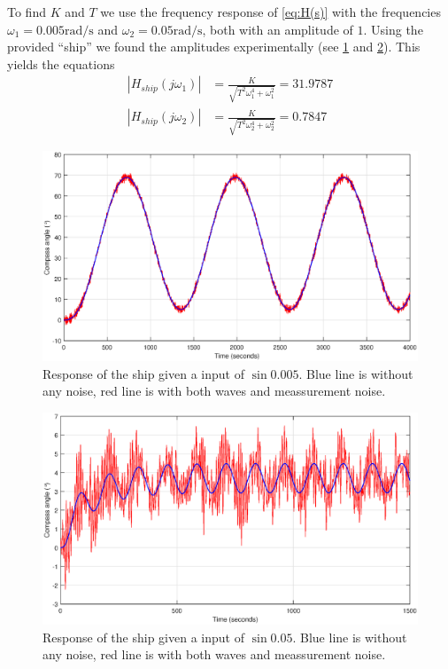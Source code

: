 To find $K$ and $T$ we use the frequency response of \cref{eq:H(s)} with the frequencies $\omega_1 = 0.005\si{\radian\per\second}$ and $\omega_2 = 0.05\si{\radian\per\second}$, both with an amplitude of $1$. Using the provided ``ship'' we found the amplitudes experimentally (see \cref{fig:sin0.005} and \cref{fig:sin0.05}). This yields the equations
\begin{subequations}
	\begin{align}
		|H_{ship}(j\omega_1)| &= \frac{K}{\sqrt{T^2\omega_1^4 + \omega_1^2}} = 31.9787 \label{eq:omega_1}\\
		|H_{ship}(j\omega_2)| &= \frac{K}{\sqrt{T^2\omega_2^4 + \omega_2^2}} = 0.7847 \label{eq:omega_2}
	\end{align}
\end{subequations}

\begin{figure}
	\centering
	\includegraphics[width=\textwidth]{images/oppg1/sin0005.eps}
	\caption{Response of the ship given a input of \ensuremath{\sin{0.005}}.
		Blue line is without any noise, red line is with both waves and meassurement noise.}
	\label{fig:sin0.005}
\end{figure}

\begin{figure}
	\centering
	\includegraphics[width=\textwidth]{images/oppg1/sin005.eps}
	\caption{Response of the ship given a input of \ensuremath{\sin{0.05}}.
		Blue line is without any noise, red line is with both waves and meassurement noise.}
	\label{fig:sin0.05}
\end{figure}

